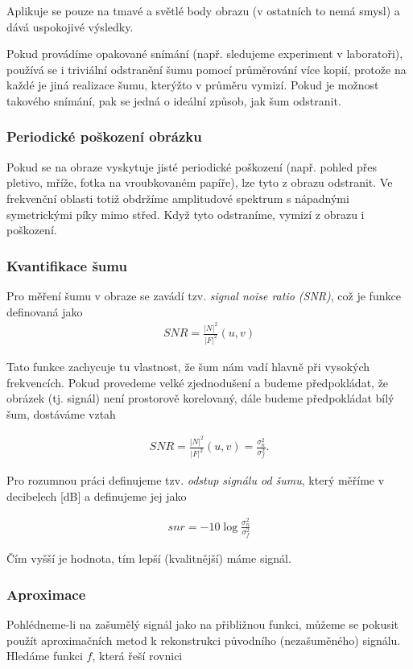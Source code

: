 Aplikuje se pouze na tmavé a světlé body obrazu (v ostatních to nemá smysl) a dává uspokojivé výsledky.

Pokud provádíme opakované snímání (např. sledujeme experiment v laboratoři), používá se i triviální odstranění šumu
pomocí průměrování více kopií, protože na každé je jiná realizace šumu, kterýžto v průměru vymizí. Pokud je možnost
takového snímání, pak se jedná o ideální způsob, jak šum odstranit.

\subsubsection{Periodické poškození obrázku}

Pokud se na obraze vyskytuje jisté periodické poškození (např. pohled přes pletivo, mříže, fotka na vroubkovaném papíře),
lze tyto  z obrazu odstranit. Ve frekvenční oblasti totiž obdržíme amplitudové spektrum s nápadnými
symetrickými píky mimo střed. Když tyto odstraníme, vymizí z obrazu i poškození.


\subsubsection{Kvantifikace šumu}

Pro měření  šumu v obraze se zavádí tzv. {\em signal noise ratio (SNR)}, což je funkce definovaná
jako
\begin{eqnarray}
SNR=\frac{|N|^2}{|F|^2}(u,v)
\end{eqnarray}

Tato funkce zachycuje tu vlastnost, že šum nám vadí hlavně při vysokých frekvencích.
Pokud provedeme velké zjednodušení a budeme předpokládat, že obrázek (tj. signál) není prostorově korelovaný, dále budeme
předpokládat bílý šum, dostáváme vztah

\begin{eqnarray}
SNR=\frac{|N|^2}{|F|^2}(u,v)=\frac{\sigma_n^2}{\sigma_f^2}.
\end{eqnarray}

Pro rozumnou práci definujeme tzv. {\em odstup signálu od šumu}, který měříme v decibelech [dB] a definujeme jej jako

\begin{eqnarray}
snr=-10\log\frac{\sigma_n^2}{\sigma_f^2}
\end{eqnarray}

Čím vyšší je hodnota, tím lepší (kvalitnější) máme signál.

\subsubsection{Aproximace}
Pohlédneme-li na zašumělý signál jako na přibližnou funkci, můžeme se pokusit použít aproximačních metod k rekonstrukci
původního (nezašuměného) signálu. Hledáme funkci $f$, která řeší rovnici

